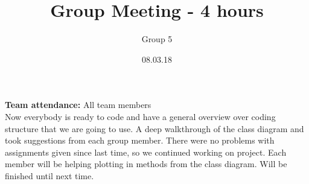 \documentclass{article}
\title{Group Meeting - 4 hours}
\author{Group 5}
\date{08.03.18}
\begin{document}
	\maketitle
	\noindent
	\textbf{Team attendance:} All team members \\

	\noindent
	Now everybody is ready to code and have a general overview over coding
	structure that we are going to use. A deep walkthrough of the class diagram
	and took suggestions from each group member. There were no problems with
	assignments given since last time, so we continued working on project.
	Each member will be helping plotting in methods from the class diagram.
	Will be finished until next time. 
\end{document}
